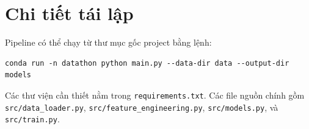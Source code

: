 ﻿\documentclass{article}
\begin{document}
\appendix
\section{Chi tiết tái lập}
Pipeline có thể chạy từ thư mục gốc project bằng lệnh:
\begin{verbatim}
conda run -n datathon python main.py --data-dir data --output-dir models
\end{verbatim}
Các thư viện cần thiết nằm trong \texttt{requirements.txt}. Các file nguồn chính gồm \texttt{src/data\_loader.py}, \texttt{src/feature\_engineering.py}, \texttt{src/models.py}, và \texttt{src/train.py}.
\end{document}
